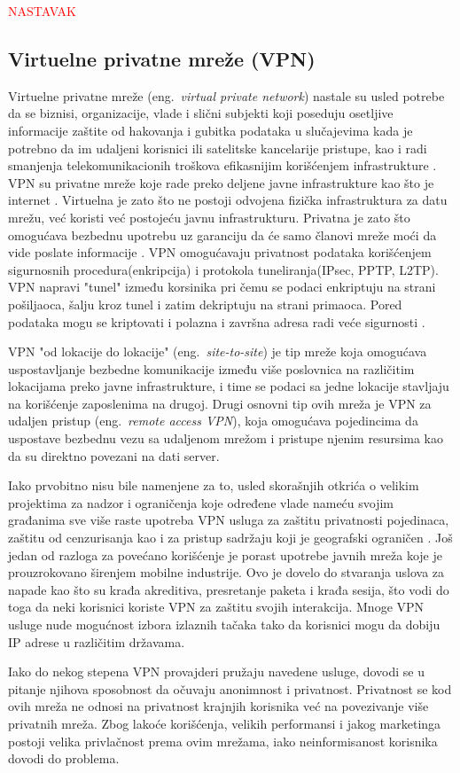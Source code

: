 \documentclass[a4paper]{article}
\newcommand\todos[1]{\textcolor{red}{#1}}
\begin{document}
\todos{ NASTAVAK }

\subsection{Virtuelne privatne mreže (VPN)}
Virtuelne privatne mreže (eng.~{\em virtual private network}) nastale su usled potrebe da se biznisi, organizacije, vlade i slični subjekti koji poseduju osetljive informacije zaštite od hakovanja i gubitka podataka u slučajevima kada je potrebno da im udaljeni korisnici ili satelitske kancelarije pristupe, kao i radi smanjenja telekomunikacionih troškova efikasnijim korišćenjem infrastrukture \cite{vpn1}. VPN su privatne mreže koje rade preko deljene javne infrastrukture kao što je internet \cite{vpn2}. Virtuelna je zato što ne postoji odvojena fizička infrastruktura za datu mrežu, već koristi već postojeću javnu infrastrukturu. Privatna je zato što  omogućava bezbednu upotrebu uz garanciju da će samo članovi mreže moći da vide poslate informacije \cite{vpn3}. VPN omogućavaju privatnost podataka korišćenjem sigurnosnih procedura(enkripcija)  i  protokola tuneliranja(IPsec, PPTP, L2TP). VPN napravi "tunel"  između korsinika pri čemu se podaci enkriptuju na strani pošiljaoca, šalju kroz tunel i zatim dekriptuju na strani primaoca. Pored podataka mogu se kriptovati i polazna i završna adresa radi veće sigurnosti \cite{vpn4}. 
\par VPN "od lokacije do lokacije" (eng.~{\em site-to-site}) je tip mreže koja omogućava uspostavljanje bezbedne komunikacije između više poslovnica na različitim lokacijama preko javne infrastrukture, i time se podaci sa jedne lokacije stavljaju na korišćenje zaposlenima na drugoj. Drugi osnovni tip ovih mreža je VPN za udaljen pristup (eng.~{\em remote access VPN}), koja omogućava pojedincima da uspostave bezbednu vezu sa udaljenom mrežom i pristupe njenim resursima kao da su direktno povezani na dati server.
\par Iako prvobitno nisu bile namenjene za to, usled skorašnjih otkrića o velikim projektima za nadzor i ograničenja koje određene vlade nameću svojim građanima sve više raste upotreba VPN usluga za zaštitu privatnosti pojedinaca, zaštitu od cenzurisanja kao i za pristup sadržaju koji je geografski ograničen \cite{vpn5}. Još jedan od razloga za povećano korišćenje je  porast upotrebe javnih mreža koje je prouzrokovano širenjem mobilne industrije. Ovo je dovelo do stvaranja uslova za napade kao što su krađa akreditiva, presretanje paketa i krađa sesija, što vodi do toga da neki korisnici koriste VPN za zaštitu svojih interakcija. Mnoge VPN usluge nude mogućnost izbora izlaznih tačaka tako da korisnici mogu da dobiju IP adrese u različitim državama.
\par Iako do nekog stepena VPN provajderi pružaju navedene usluge, dovodi se u pitanje njihova sposobnost da očuvaju anonimnost i privatnost. Privatnost se kod ovih mreža ne odnosi na privatnost krajnjih korisnika već na povezivanje više privatnih mreža. Zbog lakoće korišćenja, velikih performansi i jakog marketinga postoji velika privlačnost prema ovim mrežama, iako neinformisanost korisnika dovodi do problema.
\end{document}
